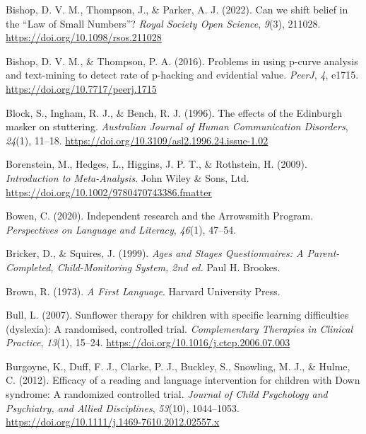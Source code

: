 \documentclass{krantz}
\newlength{\cslhangindent}
\newlength{\cslentryspacingunit} %
\newenvironment{CSLReferences}[2] %
{%
\setlength{\parindent}{0pt}
\ifodd #1
\let\oldpar\par
\def\par{\hangindent=\cslhangindent\oldpar}
\fi
\setlength{\parskip}{#2\cslentryspacingunit}
}%
{}
\begin{document}
\begin{CSLReferences}{1}{0}
\leavevmode{}%
Bishop, D. V. M., Thompson, J., \& Parker, A. J. (2022). Can we shift belief in the {``{Law} of {Small Numbers}''}? \emph{Royal Society Open Science}, \emph{9}(3), 211028. \url{https://doi.org/10.1098/rsos.211028}

\leavevmode{}%
Bishop, D. V. M., \& Thompson, P. A. (2016). Problems in using p-curve analysis and text-mining to detect rate of p-hacking and evidential value. \emph{PeerJ}, \emph{4}, e1715. \url{https://doi.org/10.7717/peerj.1715}

\leavevmode{}%
Block, S., Ingham, R. J., \& Bench, R. J. (1996). The effects of the {Edinburgh} masker on stuttering. \emph{Australian Journal of Human Communication Disorders}, \emph{24}(1), 11--18. \url{https://doi.org/10.3109/asl2.1996.24.issue-1.02}

\leavevmode{}%
Borenstein, M., Hedges, L., Higgins, J. P. T., \& Rothstein, H. (2009). \emph{Introduction to {Meta-Analysis}}. {John Wiley \& Sons, Ltd}. \url{https://doi.org/10.1002/9780470743386.fmatter}

\leavevmode{}%
Bowen, C. (2020). Independent research and the {Arrowsmith Program}. \emph{Perspectives on Language and Literacy}, \emph{46}(1), 47--54.

\leavevmode{}%
Bricker, D., \& Squires, J. (1999). \emph{Ages and {Stages Questionnaires}: {A} {Parent-Completed}, {Child-Monitoring} {System}, 2nd ed.} {Paul H. Brookes}.

\leavevmode{}%
Brown, R. (1973). \emph{A {First Language}}. {Harvard University Press}.

\leavevmode{}%
Bull, L. (2007). Sunflower therapy for children with specific learning difficulties (dyslexia): A randomised, controlled trial. \emph{Complementary Therapies in Clinical Practice}, \emph{13}(1), 15--24. \url{https://doi.org/10.1016/j.ctcp.2006.07.003}

\leavevmode{}%
Burgoyne, K., Duff, F. J., Clarke, P. J., Buckley, S., Snowling, M. J., \& Hulme, C. (2012). Efficacy of a reading and language intervention for children with {Down} syndrome: A randomized controlled trial. \emph{Journal of Child Psychology and Psychiatry, and Allied Disciplines}, \emph{53}(10), 1044--1053. \url{https://doi.org/10.1111/j.1469-7610.2012.02557.x}


\end{CSLReferences}
\end{document}
